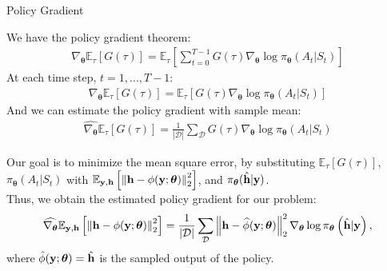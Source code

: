 \documentclass[hyperref={bookmarks=false}]{beamer}
\begin{document}
\begin{frame}[allowframebreaks]{Policy Gradient}

We have the policy gradient theorem:
\begin{align*}
    \nabla_{\boldsymbol{\theta}}\mathbb{E}_{\tau}[G(\tau)]
        =\mathbb{E}_{\tau}\left[\sum\limits_{t=0}^{T-1}G(\tau)
        \nabla_{\boldsymbol{\theta}}\log{\pi_{\boldsymbol{\theta}}
        (A_t|S_t)}\right]
\end{align*}
At each time step, $t=1,...,T-1$:
\begin{align*}
    \nabla_{\boldsymbol{\theta}}\mathbb{E}_{\tau}[G(\tau)]
        =\mathbb{E}_{\tau}\left[G(\tau)
        \nabla_{\boldsymbol{\theta}}\log{\pi_{\boldsymbol{\theta}}
        (A_t|S_t)}\right]
\end{align*}
And we can estimate the policy gradient with sample mean:
\begin{align*}
    \widehat{\nabla_{\boldsymbol{\theta}}}\mathbb{E}_{\tau}[G(\tau)]
        =\frac{1}{\left| \mathcal{D}  \right|} \sum\limits_{\mathcal{D}}
        G(\tau)\nabla_{\boldsymbol{\theta}}\log{\pi_{\boldsymbol{\theta}}
        (A_t|S_t)}
\end{align*}

\framebreak

Our goal is to minimize the mean square error, by substituting 
$\mathbb{E}_{\tau}[G(\tau)]$, $\pi_{\boldsymbol{\theta}}(A_t|S_t)$ with 
$\mathbb{E}_{{\bf y},{\bf h}}\left[\left\| {\bf h}-\phi(\mathbf{y};\boldsymbol{\theta}) \right\|^2_2 \right]$,
and $\pi_{\boldsymbol{\theta}}(\hat{{\bf h}}|{\bf y})$.\\
Thus, we obtain the estimated policy gradient for our problem:
\begin{align*}
    \widehat{\nabla_{\boldsymbol{\theta}}}
            \mathbb{E}_{{\bf y},{\bf h}}\left[\left\| {\bf h}-\phi(\mathbf{y};\boldsymbol{\theta}) \right\|^2_2 \right]
            = \frac{1}{\left| \mathcal{D}  \right|} \sum\limits_{\mathcal{D}}
            \left\| {\bf h}-\widehat{\phi}(\mathbf{y};\boldsymbol{\theta}) \right\|^2_2
            \nabla_{\boldsymbol{\theta}}
            \log \pi_{\boldsymbol{\theta}}
            \left( \hat{{\bf h}}|{\bf y} \right),
\end{align*}
where $\hat{\phi}(\mathbf{y};\boldsymbol{\theta}) = 
\hat{{\bf h}}$ is the sampled output of the policy. 

\end{frame}
\end{document}

